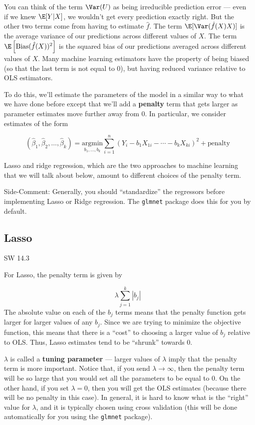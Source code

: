 \documentclass[
  letterpaper,
  DIV=11,
  numbers=noendperiod]{scrreprt}
\begin{document}
You can think of the term \(\Var(U)\) as being irreducible prediction
error --- even if we knew \(\E[Y|X]\), we wouldn't get every prediction
exactly right. But the other two terms come from having to estimate
\(\hat{f}\). The term \(\E[\Var(\hat{f}(X)X)]\) is the average variance
of our predictions across different values of \(X\). The term
\(\E\left[\textrm{Bias}(\hat{f}(X))^2\right]\) is the squared bias of
our predictions averaged across different values of \(X\). Many machine
learning estimators have the property of being biased (so that the last
term is not equal to 0), but having reduced variance relative to OLS
estimators.

To do this, we'll estimate the parameters of the model in a similar way
to what we have done before except that we'll add a \textbf{penalty}
term that gets larger as parameter estimates move further away from 0.
In particular, we consider estimates of the form

\[
  (\hat{\beta}_1, \hat{\beta}_2, \ldots, \hat{\beta}_k) = \underset{b_1,\ldots,b_k}{\textrm{argmin}} \sum_{i=1}^n  (Y_i - b_1 X_{1i} - \cdots - b_k X_{ki})^2 + \textrm{penalty}
\]

Lasso and ridge regression, which are the two approaches to machine
learning that we will talk about below, amount to different choices of
the penalty term.

{Side-Comment:} Generally, you should ``standardize'' the regressors
before implementing Lasso or Ridge regression. The \texttt{glmnet}
package does this for you by default.

\subsection{Lasso}\label{lasso}

SW 14.3

For Lasso, the penalty term is given by

\[
  \lambda \sum_{j=1}^k |b_j|
\] The absolute value on each of the \(b_j\) terms means that the
penalty function gets larger for larger values of any \(b_j\). Since we
are trying to minimize the objective function, this means that there is
a ``cost'' to choosing a larger value of \(b_j\) relative to OLS. Thus,
Lasso estimates tend to be ``shrunk'' towards 0.

\(\lambda\) is called a \textbf{tuning parameter} --- larger values of
\(\lambda\) imply that the penalty term is more important. Notice that,
if you send \(\lambda \rightarrow \infty\), then the penalty term will
be so large that you would set all the parameters to be equal to 0. On
the other hand, if you set \(\lambda=0\), then you will get the OLS
estimates (because there will be no penalty in this case). In general,
it is hard to know what is the ``right'' value for \(\lambda\), and it
is typically chosen using cross validation (this will be done
automatically for you using the \texttt{glmnet} package).
\end{document}
